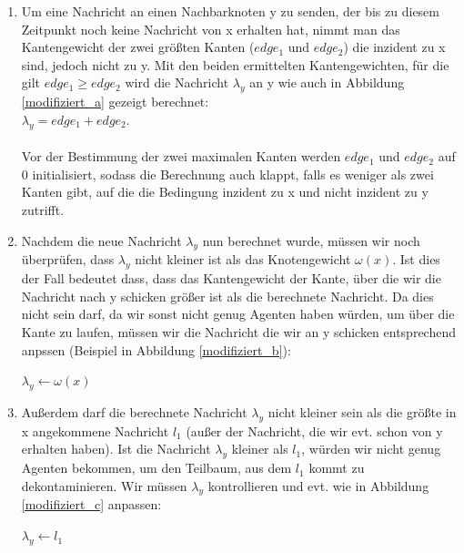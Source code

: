 \begin{enumerate}[label=\alph*)]
	
	\item 
		Um eine Nachricht an einen Nachbarknoten y zu senden, der bis zu diesem Zeitpunkt noch keine Nachricht von x erhalten hat, nimmt man das Kantengewicht der zwei größten Kanten ($edge_{1}$ und $edge_{2}$) die inzident zu x sind, jedoch nicht zu y. Mit den beiden ermittelten Kantengewichten, für die gilt $edge_{1} \ge edge_{2}$ wird die Nachricht $\lambda_{y}$ an y wie auch in Abbildung \ref{modifiziert_a} gezeigt berechnet:\\
		$\lambda_{y} = edge_{1} + edge_{2}$.
		\\
		\\
		Vor der Bestimmung der zwei maximalen Kanten werden $edge_{1}$ und $edge_{2}$ auf 0 initialisiert, sodass die Berechnung auch klappt, falls es weniger als zwei Kanten gibt, auf die die Bedingung inzident zu x und nicht inzident zu y  zutrifft.
	
	\item
		Nachdem die neue Nachricht $\lambda_{y}$ nun berechnet wurde, müssen wir noch überprüfen, dass $\lambda_{y}$ nicht kleiner ist als das Knotengewicht $\omega(x)$. Ist dies der Fall bedeutet dass, dass das Kantengewicht der Kante, über die wir die Nachricht nach y schicken größer ist als die berechnete Nachricht. Da dies nicht sein darf, da wir sonst nicht genug Agenten haben würden, um über die Kante zu laufen, müssen wir die Nachricht die wir an y schicken entsprechend anpssen (Beispiel in Abbildung \ref{modifiziert_b}):
		
		\begin{algorithmic}
			\State $\lambda_{y} \gets \omega(x)$
			\EndIf
		\end{algorithmic}
	
	\item
		Außerdem darf die berechnete Nachricht $\lambda_{y}$ nicht kleiner sein als die größte in x angekommene Nachricht $l_{1}$ (außer der Nachricht, die wir evt. schon von y erhalten haben). Ist die Nachricht $\lambda_{y}$ kleiner als $l_{1}$, würden wir nicht genug Agenten bekommen, um den Teilbaum, aus dem $l_{1}$ kommt zu dekontaminieren. Wir müssen $\lambda_{y}$ kontrollieren und evt. wie in Abbildung \ref{modifiziert_c} anpassen:
		
		\begin{algorithmic}
			\If {$\lambda_{y} \leq l_{1}$}
			\State $\lambda_{y} \gets l_{1}$
			\EndIf
		\end{algorithmic}
	
\end{enumerate}

